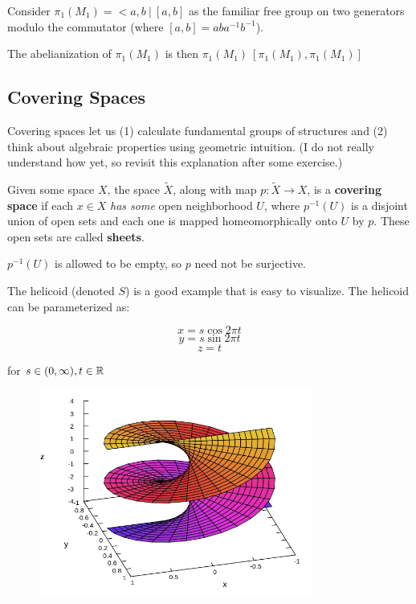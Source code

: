 \documentclass[10pt]{article}
\begin{document}
\begin{note}[Abelianization of $\pi_1(M_1)$]
	Consider $\pi_1(M_1) = < a, b ~|~ [a, b]$ as the familiar free group on two
	generators modulo the commutator (where $[a, b] = aba^{-1}b^{-1}$).

	The abelianization of $\pi_1(M_1)$ is then $\pi_1(M_1) \ [\pi_1(M_1), \pi_1(M_1)]$
\end{note}

\subsection{Covering Spaces}

Covering spaces let us (1) calculate fundamental groups of structures and (2)
think about algebraic properties using geometric intuition. (I do not really
understand how yet, so revisit this explanation after some exercise.)

\begin{definition}

	Given some space $X$, the space $\tilde{X}$, along with map $p: \tilde{X} \to
	X$, is a \textbf{covering space} if each $x \in X$ \textit{has some} open neighborhood
	$U$, where $p^{-1}(U)$ is a disjoint union of open sets and each one is
	mapped homeomorphically onto $U$ by $p$. These open sets are called
	\textbf{sheets}.
	
	$p^{-1}(U)$ is allowed to be empty, so $p$ need not be surjective.

\end{definition}

The helicoid (denoted $S$) is a good example that is easy to visualize. The helicoid can be
parameterized as: 

\[x = s \cos 2\pi t \]
\[y = s \sin 2\pi t \]
\[z = t \]

for $s \in (0, \infty), t \in \mathbb{R}$

\begin{figure}[ht!]
\centering
\includegraphics[width=90mm]{./helicoid.png}
\caption{}
\end{figure}
\end{document}
